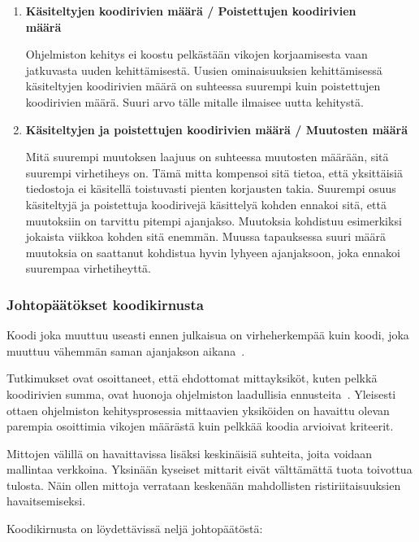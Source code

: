 \documentclass[finnish]{../tktltiki2}
\theoremstyle{definition}
\theoremstyle{remark}
\begin{document}
\begin{enumerate}
    \item {\bf Käsiteltyjen koodirivien määrä / Poistettujen koodirivien\\määrä}
    
    Ohjelmiston kehitys ei koostu pelkästään vikojen korjaamisesta vaan jatkuvasta uuden kehittämisestä. Uusien 
    ominaisuuksien kehittämisessä käsiteltyjen koodirivien määrä on suhteessa suurempi kuin poistettujen koodirivien 
    määrä. Suuri arvo tälle mitalle ilmaisee uutta kehitystä.

    \item {\bf Käsiteltyjen ja poistettujen koodirivien määrä / Muutosten määrä}
    
    Mitä suurempi muutoksen laajuus on suhteessa muutosten määrään, sitä suurempi virhetiheys on. Tämä mitta kompensoi 
    sitä tietoa, että yksittäisiä tiedostoja ei käsitellä toistuvasti pienten korjausten takia. Suurempi osuus 
    käsiteltyjä ja poistettuja koodirivejä käsittelyä kohden ennakoi sitä, että muutoksiin on tarvittu pitempi 
    ajanjakso. Muutoksia kohdistuu esimerkiksi jokaista viikkoa kohden sitä enemmän. Muussa tapauksessa suuri määrä 
    muutoksia on saattanut kohdistua hyvin lyhyeen ajanjaksoon, joka ennakoi suurempaa virhetiheyttä.

\end{enumerate}

\subsubsection{Johtopäätökset koodikirnusta}

Koodi joka muuttuu useasti ennen julkaisua on virheherkempää kuin koodi, joka muuttuu vähemmän saman ajanjakson 
aikana~\cite{NB05}.

    Tutkimukset ovat osoittaneet, että ehdottomat mittayksiköt, kuten pelkkä koodirivien summa, ovat huonoja ohjelmiston 
laadullisia ennusteita~\cite{NB05}. Yleisesti ottaen ohjelmiston kehitysprosessia mittaavien yksiköiden on havaittu 
olevan parempia osoittimia vikojen määrästä kuin pelkkää koodia arvioivat kriteerit.

    Mittojen välillä on havaittavissa lisäksi keskinäisiä suhteita, joita voidaan mallintaa verkkoina. Yksinään kyseiset 
mittarit eivät välttämättä tuota toivottua tulosta. Näin ollen mittoja verrataan keskenään mahdollisten 
ristiriitaisuuksien havaitsemiseksi.\newline

\noindent Koodikirnusta on löydettävissä neljä johtopäätöstä:
\end{document}
